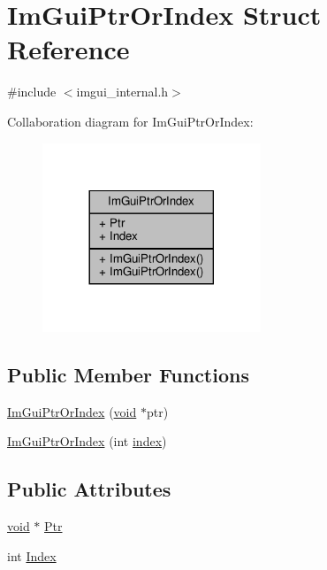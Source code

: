 \hypertarget{structImGuiPtrOrIndex}{}\section{Im\+Gui\+Ptr\+Or\+Index Struct Reference}
\label{structImGuiPtrOrIndex}


{\ttfamily \#include $<$imgui\+\_\+internal.\+h$>$}



Collaboration diagram for Im\+Gui\+Ptr\+Or\+Index\+:
\nopagebreak
\begin{figure}[H]
\begin{center}
\leavevmode
\includegraphics[width=185pt]{structImGuiPtrOrIndex__coll__graph}
\end{center}
\end{figure}
\subsection*{Public Member Functions}
\begin{DoxyCompactItemize}
\item 
\hyperlink{structImGuiPtrOrIndex_a4dd680dd14b154bf7ad6b2c8a2ef508c}{Im\+Gui\+Ptr\+Or\+Index} (\hyperlink{imgui__impl__opengl3__loader_8h_ac668e7cffd9e2e9cfee428b9b2f34fa7}{void} $\ast$ptr)
\item 
\hyperlink{structImGuiPtrOrIndex_a9a7f7991864bc7fa1447d36fc4eb5a3a}{Im\+Gui\+Ptr\+Or\+Index} (int \hyperlink{imgui__impl__opengl3__loader_8h_a57f14e05b1900f16a2da82ade47d0c6d}{index})
\end{DoxyCompactItemize}
\subsection*{Public Attributes}
\begin{DoxyCompactItemize}
\item 
\hyperlink{imgui__impl__opengl3__loader_8h_ac668e7cffd9e2e9cfee428b9b2f34fa7}{void} $\ast$ \hyperlink{structImGuiPtrOrIndex_a9171d3539aed08cc1ffd543c63ce2891}{Ptr}
\item 
int \hyperlink{structImGuiPtrOrIndex_a72a74b99b115fd7de626170dd918e64a}{Index}
\end{DoxyCompactItemize}


